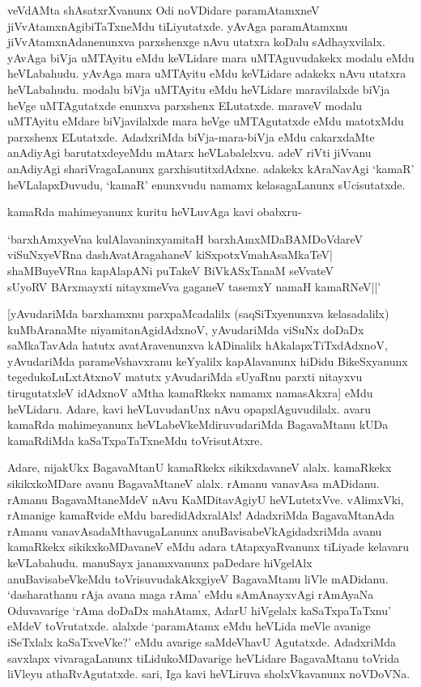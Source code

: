veVdAMta shAsatxrXvanunx Odi noVDidare paramAtamxneV jiVvAtamxnAgibiTaTxneMdu tiLiyutatxde. yAvAga paramAtamxnu jiVvAtamxnAdanenunxva parxshenxge nAvu utatxra koDalu sAdhayxvilalx. yAvAga biVja uMTAyitu eMdu keVLidare mara uMTAguvudakekx modalu eMdu heVLabahudu. yAvAga mara uMTAyitu eMdu keVLidare adakekx nAvu utatxra heVLabahudu. modalu biVja uMTAyitu eMdu heVLidare maravilalxde biVja heVge uMTAgutatxde enunxva parxshenx ELutatxde. maraveV modalu uMTAyitu eMdare biVjavilalxde mara heVge uMTAgutatxde eMdu matotxMdu parxshenx ELutatxde. AdadxriMda biVja-mara-biVja eMdu cakarxdaMte anAdiyAgi barutatxdeyeMdu mAtarx heVLabalelxvu. adeV riVti jiVvanu anAdiyAgi shariVragaLanunx garxhisutitxdAdxne. adakekx kAraNavAgi `kamaR' heVLalapxDuvudu, `kamaR' enunxvudu namamx kelasagaLanunx sUcisutatxde.

kamaRda mahimeyanunx kuritu heVLuvAga kavi obabxru-

\begin{shloka}
`barxhAmxyeVna kulAlavaninxyamitaH barxhAmxMDaBAMDoVdareV\\
viSuNxyeVRna dashAvatAragahaneV kiSxpotxVmahAsaMkaTeV|\\
shaMBuyeVRna kapAlapANi puTakeV BiVkASxTanaM seVvateV\\
sUyoRV BArxmayxti nitayxmeVva gaganeV tasemxY namaH kamaRNeV||'
\end{shloka}

[yAvudariMda barxhamxnu parxpaMcadalilx (saqSiTxyenunxva kelasadalilx) kuMbAranaMte niyamitanAgidAdxnoV, yAvudariMda viSuNx doDaDx saMkaTavAda hatutx avatAravenunxva kADinalilx hAkalapxTiTxdAdxnoV, yAvudariMda parameVshavxranu keYyalilx kapAlavanunx hiDidu BikeSxyanunx tegedukoLuLxtAtxnoV matutx yAvudariMda sUyaRnu parxti nitayxvu tirugutatxleV idAdxnoV aMtha kamaRkekx namamx namasAkxra] eMdu heVLidaru. Adare, kavi heVLuvudanUnx nAvu opapxlAguvudilalx. avaru kamaRda mahimeyanunx heVLabeVkeMdiruvudariMda BagavaMtanu kUDa kamaRdiMda kaSaTxpaTaTxneMdu toVrisutAtxre.

Adare, nijakUkx BagavaMtanU kamaRkekx sikikxdavaneV alalx. kamaRkekx sikikxkoMDare avanu BagavaMtaneV alalx. rAmanu vanavAsa mADidanu. rAmanu BagavaMtaneMdeV nAvu KaMDitavAgiyU heVLutetxVve. vAlimxVki, rAmanige kamaRvide eMdu baredidAdxralAlx! AdadxriMda BagavaMtanAda rAmanu vanavAsadaMthavugaLanunx anuBavisabeVkAgidadxriMda avanu kamaRkekx sikikxkoMDavaneV eMdu adara tAtapxyaRvanunx tiLiyade kelavaru keVLabahudu. manuSayx janamxvanunx paDedare hiVgelAlx anuBavisabeVkeMdu toVrisuvudakAkxgiyeV BagavaMtanu liVle mADidanu. `dasharathanu rAja avana maga rAma' eMdu sAmAnayxvAgi rAmAyaNa Oduvavarige `rAma doDaDx mahAtamx, AdarU hiVgelalx kaSaTxpaTaTxnu' eMdeV toVrutatxde. alalxde `paramAtamx eMdu heVLida meVle avanige iSeTxlalx kaSaTxveVke?' eMdu avarige saMdeVhavU Agutatxde. AdadxriMda savxlapx vivaragaLanunx tiLidukoMDavarige heVLidare BagavaMtanu toVrida liVleyu athaRvAgutatxde. sari, Iga kavi heVLiruva sholxVkavanunx noVDoVNa.

